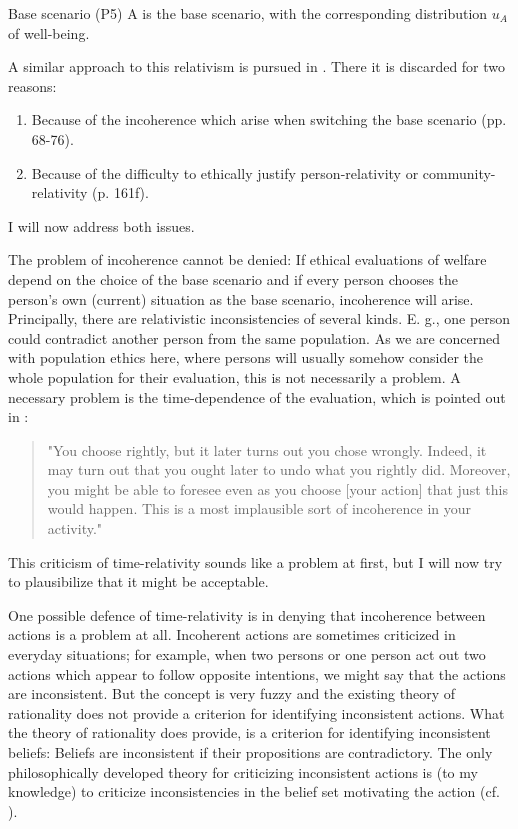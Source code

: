 \begin{Premise}{Base scenario (P5)}{}
A is the base scenario, with the corresponding distribution $u_A$ of well-being.
\end{Premise}

A similar approach  to this relativism is pursued in . There it is discarded for two reasons:
\begin{enumerate}
\item Because of the incoherence which arise when switching the base scenario (pp. 68-76). 
\item Because of the difficulty to ethically justify person-relativity or com\-mu\-ni\-ty-relativity (p. 161f). 
\end{enumerate}
I will now address both issues.  

The problem of incoherence cannot be denied: If ethical evaluations of welfare depend on the choice of the base scenario and if every person chooses the person's own (current) situation as the base scenario, incoherence will arise. Principally, there are relativistic inconsistencies of several kinds. E. g., one person could contradict another person from the same population. As we are concerned with population ethics here, where persons will usually somehow consider the whole population for their evaluation, this is not necessarily a problem. A necessary problem is the time-dependence of the evaluation, which is pointed out in : 
\begin{quote}
"You choose rightly, but it later turns out you chose wrongly. Indeed, it may turn out that you ought later to undo what you rightly did. Moreover, you might be able to foresee even as you choose [your action] that just this would happen. This is a most implausible sort of incoherence in your activity."
\end{quote}

This criticism of time-relativity sounds like a problem at first, but I will now try to plausibilize that it might be acceptable. 


One possible defence of time-relativity is in denying that incoherence between actions is a problem at all. Incoherent actions are sometimes criticized in everyday situations; for example, when two persons or one person act out two actions which appear to follow opposite intentions, we might say that the actions are inconsistent. But the concept is very fuzzy and the existing theory of rationality does not provide a criterion for identifying inconsistent actions. What the theory of rationality does provide, is a criterion for identifying inconsistent beliefs: Beliefs are inconsistent if their propositions are contradictory. The only philosophically developed theory for criticizing inconsistent actions is (to my knowledge) to criticize inconsistencies in the belief set motivating the action (cf. ). 

